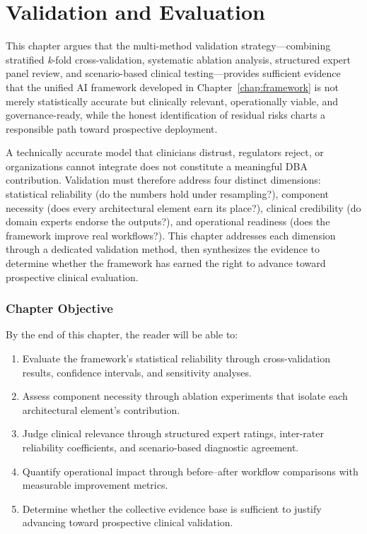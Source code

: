
\chapter{Validation and Evaluation}
\label{chap:validation}

This chapter argues that the multi-method validation strategy---combining stratified \textit{k}-fold cross-validation, systematic ablation analysis, structured expert panel review, and scenario-based clinical testing---provides sufficient evidence that the unified AI framework developed in Chapter~\ref{chap:framework} is not merely statistically accurate but clinically relevant, operationally viable, and governance-ready, while the honest identification of residual risks charts a responsible path toward prospective deployment.

A technically accurate model that clinicians distrust, regulators reject, or organizations cannot integrate does not constitute a meaningful DBA contribution. Validation must therefore address four distinct dimensions: statistical reliability (do the numbers hold under resampling?), component necessity (does every architectural element earn its place?), clinical credibility (do domain experts endorse the outputs?), and operational readiness (does the framework improve real workflows?). This chapter addresses each dimension through a dedicated validation method, then synthesizes the evidence to determine whether the framework has earned the right to advance toward prospective clinical evaluation.

\subsection{Chapter Objective}
\label{sec:val_objective}

By the end of this chapter, the reader will be able to:
\begin{enumerate}[label=\alph*)]
    \item Evaluate the framework's statistical reliability through cross-validation results, confidence intervals, and sensitivity analyses.
    \item Assess component necessity through ablation experiments that isolate each architectural element's contribution.
    \item Judge clinical relevance through structured expert ratings, inter-rater reliability coefficients, and scenario-based diagnostic agreement.
    \item Quantify operational impact through before--after workflow comparisons with measurable improvement metrics.
    \item Determine whether the collective evidence base is sufficient to justify advancing toward prospective clinical validation.
\end{enumerate}

